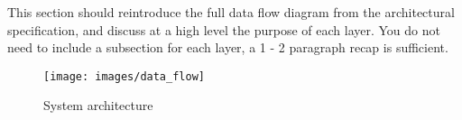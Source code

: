This section should reintroduce the full data flow diagram from the architectural specification, and discuss at a high level the purpose of each layer. You do not need to include a subsection for each layer, a 1 - 2 paragraph recap is sufficient.

\begin{figure}[h!]
	\centering
 	\texttt{[image: images/data\_flow]}
 \caption{System architecture}
\end{figure}